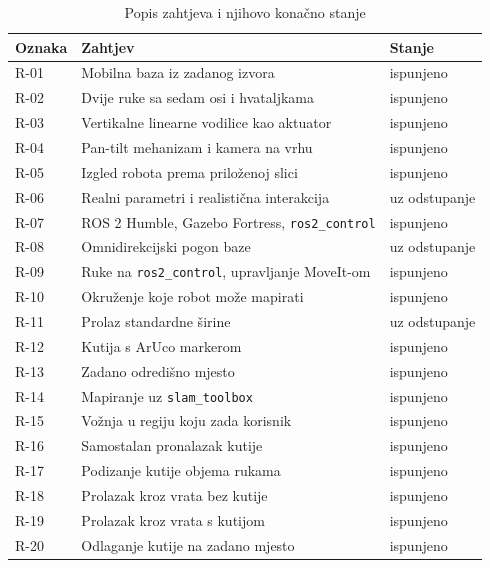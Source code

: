 \documentclass[12pt,a4paper]{article}
\begin{document}
\begin{table}[!htbp]
    \centering
    \caption{Popis zahtjeva i njihovo konačno stanje}
    \label{tab:zahtjevi}
    \scriptsize
    \begin{tabularx}{\textwidth}{@{}l X l@{}}
        \toprule
        \textbf{Oznaka} & \textbf{Zahtjev} & \textbf{Stanje} \\
        \midrule
        R-01 & Mobilna baza iz zadanog izvora                        & ispunjeno \\
        R-02 & Dvije ruke sa sedam osi i hvataljkama                 & ispunjeno \\
        R-03 & Vertikalne linearne vodilice kao aktuator             & ispunjeno \\
        R-04 & Pan-tilt mehanizam i kamera na vrhu                   & ispunjeno \\
        R-05 & Izgled robota prema priloženoj slici                  & ispunjeno \\
        R-06 & Realni parametri i realistična interakcija            & uz odstupanje \\
        R-07 & ROS 2 Humble, Gazebo Fortress, \texttt{ros2\_control} & ispunjeno \\
        R-08 & Omnidirekcijski pogon baze                            & uz odstupanje \\
        R-09 & Ruke na \texttt{ros2\_control}, upravljanje MoveIt-om & ispunjeno \\
        R-10 & Okruženje koje robot može mapirati                    & ispunjeno \\
        R-11 & Prolaz standardne širine                              & uz odstupanje \\
        R-12 & Kutija s ArUco markerom                               & ispunjeno \\
        R-13 & Zadano odredišno mjesto                               & ispunjeno \\
        R-14 & Mapiranje uz \texttt{slam\_toolbox}                   & ispunjeno \\
        R-15 & Vožnja u regiju koju zada korisnik                    & ispunjeno \\
        R-16 & Samostalan pronalazak kutije                          & ispunjeno \\
        R-17 & Podizanje kutije objema rukama                        & ispunjeno \\
        R-18 & Prolazak kroz vrata bez kutije                        & ispunjeno \\
        R-19 & Prolazak kroz vrata s kutijom                         & ispunjeno \\
        R-20 & Odlaganje kutije na zadano mjesto                     & ispunjeno \\
        \bottomrule
    \end{tabularx}
\end{table}
\end{document}
